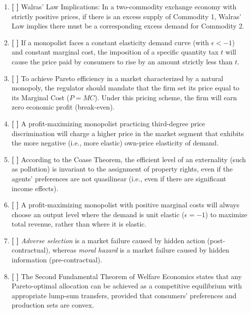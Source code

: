 \documentclass[12pt, a4paper]{article}
\begin{document}
\begin{enumerate}
    \item \textbf{[ \quad ]} Walras' Law Implications: In a two-commodity exchange economy with strictly positive prices, if there is an excess supply of Commodity 1, Walras' Law implies there must be a corresponding excess demand for Commodity 2.
    
    \item \textbf{[ \quad ]} If a monopolist faces a constant elasticity demand curve (with $\epsilon < -1$) and constant marginal cost, the imposition of a specific quantity tax $t$ will cause the price paid by consumers to rise by an amount strictly less than $t$.
    
    \item \textbf{[ \quad ]} To achieve Pareto efficiency in a market characterized by a natural monopoly, the regulator should mandate that the firm set its price equal to its Marginal Cost ($P = MC$). Under this pricing scheme, the firm will earn zero economic profit (break-even).
    
    \item \textbf{[ \quad ]}  A profit-maximizing monopolist practicing third-degree price discrimination will charge a higher price in the market segment that exhibits the more negative (i.e., more elastic) own-price elasticity of demand.
    
    \item \textbf{[ \quad ]} According to the Coase Theorem, the efficient level of an externality (such as pollution) is invariant to the assignment of property rights, even if the agents' preferences are not quasilinear (i.e., even if there are significant income effects).
    
    \item \textbf{[ \quad ]}  A profit-maximizing monopolist with positive marginal costs will always choose an output level where the demand is unit elastic ($\epsilon = -1$) to maximize total revenue, rather than where it is elastic.
    
    \item \textbf{[ \quad ]} \textit{Adverse selection} is a market failure caused by hidden action (post-contractual), whereas \textit{moral hazard} is a market failure caused by hidden information (pre-contractual).
    
    \item \textbf{[ \quad ]} The Second Fundamental Theorem of Welfare Economics states that any Pareto-optimal allocation can be achieved as a competitive equilibrium with appropriate lump-sum transfers, provided that consumers' preferences and production sets are convex.
    

\end{enumerate}
\end{document}
